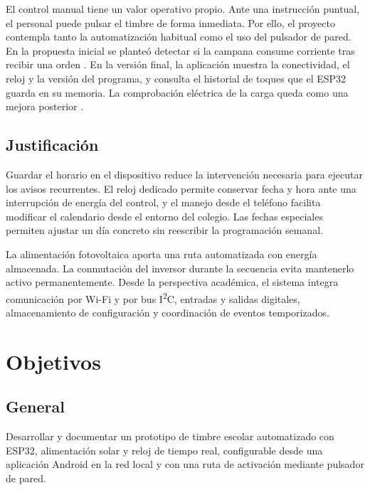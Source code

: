 \documentclass[a4paper,11pt]{article}
\begin{document}
El control manual tiene un valor operativo propio. Ante una instrucción puntual, el personal puede pulsar el timbre de forma inmediata. Por ello, el proyecto contempla tanto la automatización habitual como el uso del pulsador de pared. En la propuesta inicial se planteó detectar si la campana consume corriente tras recibir una orden \cite{propuesta}. En la versión final, la aplicación muestra la conectividad, el reloj y la versión del programa, y consulta el historial de toques que el ESP32 guarda en su memoria. La comprobación eléctrica de la carga queda como una mejora posterior \cite{ficha,evidencia}.

\subsection{Justificación}
Guardar el horario en el dispositivo reduce la intervención necesaria para ejecutar los avisos recurrentes. El reloj dedicado permite conservar fecha y hora ante una interrupción de energía del control, y el manejo desde el teléfono facilita modificar el calendario desde el entorno del colegio. Las fechas especiales permiten ajustar un día concreto sin reescribir la programación semanal.

La alimentación fotovoltaica aporta una ruta automatizada con energía almacenada. La conmutación del inversor durante la secuencia evita mantenerlo activo permanentemente. Desde la perspectiva académica, el sistema integra comunicación por Wi-Fi y por bus I\textsuperscript{2}C, entradas y salidas digitales, almacenamiento de configuración y coordinación de eventos temporizados.

\section{Objetivos}
\subsection{General}
Desarrollar y documentar un prototipo de timbre escolar automatizado con ESP32, alimentación solar y reloj de tiempo real, configurable desde una aplicación Android en la red local y con una ruta de activación mediante pulsador de pared.
\end{document}
